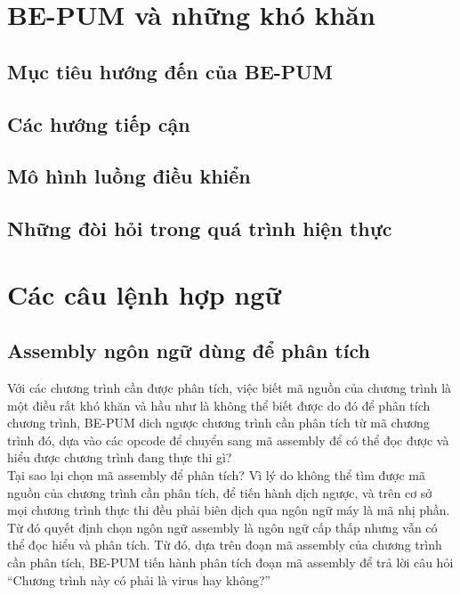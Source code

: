 \section{BE-PUM và những khó khăn}

	\subsection{Mục tiêu hướng đến của BE-PUM}

	\subsection{Các hướng tiếp cận}

	\subsection{Mô hình luồng điều khiển}

	\subsection{Những đòi hỏi trong quá trình hiện thực}


\section{Các câu lệnh hợp ngữ}
  \subsection{Assembly ngôn ngữ dùng để phân tích }
  Với các chương trình cần được phân tích, việc biết mã nguồn của chương trình là một điều rất khó khăn và hầu như là không thể biết được do đó để phân tích chương trình, BE-PUM dich ngược chương trình cần phân tích từ mã chương trình đó, dựa vào các opcode để chuyển sang mã assembly để có thể đọc được và hiểu được chương trình đang thực thi gì?\\

Tại sao lại chọn mã assembly để phân tích? Vì lý do không thể tìm được mã nguồn của chương trình cần phân tích, để tiến hành dịch ngược, và trên cơ sở mọi chương trình thực thi đều phải biên dịch qua ngôn ngữ máy là mã nhị phần. Từ đó quyết định chọn ngôn ngữ assembly là ngôn ngữ cấp thấp nhưng vẫn có thể đọc hiểu và phân tích. Từ đó, dựa trên đoạn mã assembly của chương trình cần phân tích, BE-PUM tiến hành phân tích đoạn mã assembly để trả lời câu hỏi “Chương trình này có phải là virus hay không?”\\

